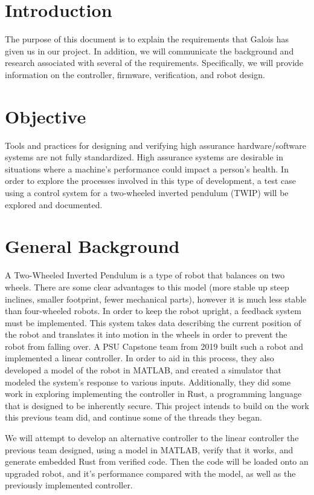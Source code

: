 \documentclass[a4paper,12pt]{article}
\begin{document}
\section{Introduction}
	The purpose of this document is to explain the requirements that Galois has given us in our project. In addition, we will communicate the background and research associated with several of the requirements. Specifically, we will provide information on the controller, firmware, verification, and robot design.
	
\section{Objective}
	Tools and practices for designing and verifying high assurance hardware/software systems are not fully standardized. High assurance systems are desirable in situations where a machine's performance could impact a person's health. In order to explore the processes involved in this type of development, a test case using a control system for a two-wheeled inverted pendulum (TWIP) will be explored and documented.
	
\section{General Background}
	A Two-Wheeled Inverted Pendulum is a type of robot that balances on two wheels. There are some clear advantages to this model (more stable up steep inclines, smaller footprint, fewer mechanical parts), however it is much less stable than four-wheeled robots. In order to keep the robot upright, a feedback system must be implemented. This system takes data describing the current position of the robot and translates it into motion in the wheels in order to prevent the robot from falling over. A PSU Capstone team from 2019 built such a robot and implemented a linear controller. In order to aid in this process, they also developed a model of the robot in MATLAB, and created a simulator that modeled the system's response to various inputs. Additionally, they did some work in exploring implementing the controller in Rust, a programming language that is designed to be inherently secure. This project intends to build on the work this previous team did, and continue some of the threads they began. 
	
	We will attempt to develop an alternative controller to the linear controller the previous team designed, using a model in MATLAB, verify that it works, and generate embedded Rust from verified code. Then the code will be loaded onto an upgraded robot, and it's performance compared with the model, as well as the previously implemented controller.
	
\end{document}
